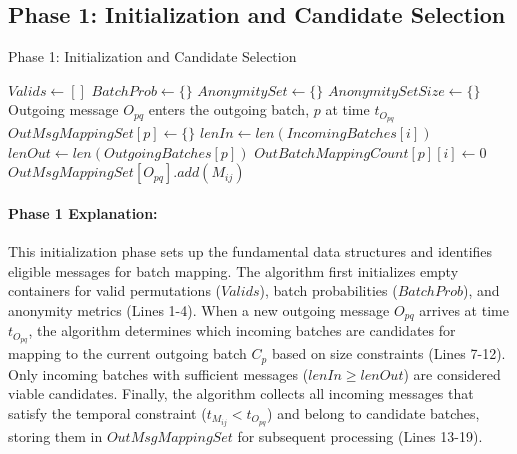 \documentclass{article}
\begin{document}
\subsection{Phase 1: Initialization and Candidate Selection}

\begin{algorithm}[H]
\caption{Phase 1: Initialization and Candidate Selection}
\begin{algorithmic}[1]
\State $Valids \gets [] $
\State $BatchProb \gets \{ \} $
\State $ AnonymitySet \gets \{ \} $
\State $ AnonymitySetSize \gets \{ \} $
\State Outgoing message $O_{pq}$ enters the outgoing batch, $p$ at time $t_{O_{pq}}$
\State $OutMsgMappingSet [p] \gets \{ \} $
    \State $ lenIn \gets len(IncomingBatches[i]) $
    \State $ lenOut \gets len(OutgoingBatches[p]) $
        \State $OutBatchMappingCount[p][i] \gets 0 $
    \EndIf
\EndFor
{}
            \State $ OutMsgMappingSet[O_{pq}].add(M_{ij}) $
        \EndIf
    \EndFor
\EndFor
\end{algorithmic}
\end{algorithm}

\paragraph{Phase 1 Explanation:}
This initialization phase sets up the fundamental data 
structures and identifies eligible messages for batch 
mapping. The algorithm first initializes empty containers 
for valid permutations ($Valids$), batch probabilities 
($BatchProb$), and anonymity metrics (Lines 1-4). 
When a new outgoing message $O_{pq}$ arrives at time 
$t_{O_{pq}}$, the algorithm determines which incoming 
batches are candidates for mapping to the current 
outgoing batch $C_p$ based on size constraints (Lines 7-12). 
Only incoming batches with sufficient messages 
($lenIn \geq lenOut$) are considered viable candidates. 
Finally, the algorithm collects all incoming messages 
that satisfy the temporal constraint ($t_{M_{ij}} < t_{O_{pq}}$) 
and belong to candidate batches, storing them in 
$OutMsgMappingSet$ for subsequent processing (Lines 13-19).
\end{document}

